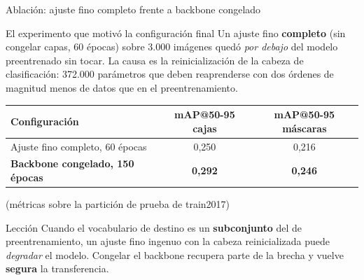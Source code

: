 \documentclass[aspectratio=169,11pt]{beamer}
\begin{document}
\begin{frame}{Ablación: ajuste fino completo frente a backbone congelado}
  \begin{block}{El experimento que motivó la configuración final}
    \footnotesize
    Un ajuste fino \textbf{completo} (sin congelar capas, 60 épocas) sobre 3.000 imágenes
    quedó \emph{por debajo} del modelo preentrenado sin tocar. La causa es la
    reinicialización de la cabeza de clasificación: 372.000 parámetros que deben
    reaprenderse con dos órdenes de magnitud menos de datos que en el preentrenamiento.
  \end{block}

  \vspace{0.5em}
  \centering
  \small
  \begin{tabular}{@{}lcc@{}}
    \toprule
    \textbf{Configuración} & \textbf{mAP@50-95 cajas} & \textbf{mAP@50-95 máscaras} \\
    \midrule
    Ajuste fino completo, 60 épocas & 0,250 & 0,216 \\
    \textbf{Backbone congelado, 150 épocas} & \textbf{0,292} & \textbf{0,246} \\
    \bottomrule
  \end{tabular}

  \vspace{0.3em}
  {\scriptsize (métricas sobre la partición de prueba de train2017)}

  \vspace{0.6em}
  \begin{exampleblock}{Lección}
    \footnotesize
    Cuando el vocabulario de destino es un \textbf{subconjunto} del de preentrenamiento, un
    ajuste fino ingenuo con la cabeza reinicializada puede \emph{degradar} el modelo.
    Congelar el backbone recupera parte de la brecha y vuelve \textbf{segura} la
    transferencia.
  \end{exampleblock}
\end{frame}
\end{document}
